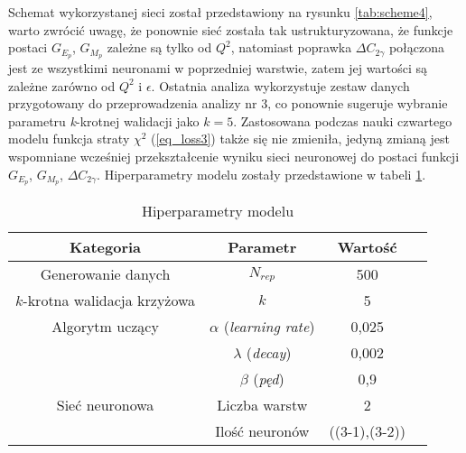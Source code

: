 \documentclass[11pt]{book}
\theoremstyle{definition}
\begin{document}
\begin{SCfigure}[][h]
{}
	\caption{Schemat sieci neuronowej zastosowanej w czwartej analizie, struktura jest bliźniacza do sieci zastosowanej w trzeciej analizie jednak neurony w warstwie wyjściowej modelu zmieniły się na: $o_{E_p}$, $o_{M_p}$ i $o_{2\gamma}$ } \label{tab:scheme4} 	
\end{SCfigure}

%
Schemat wykorzystanej sieci został przedstawiony na rysunku \ref{tab:scheme4}, warto zwrócić uwagę, że ponownie sieć została tak ustrukturyzowana, że funkcje postaci $G_{E_p}$, $G_{M_p}$ zależne są tylko od $Q^2$, natomiast poprawka $\Delta C_{2\gamma}$ połączona jest ze wszystkimi neuronami w poprzedniej warstwie, zatem jej wartości są zależne zarówno od $Q^2$ i $\epsilon$. Ostatnia analiza wykorzystuje zestaw danych przygotowany do przeprowadzenia analizy nr 3, co ponownie sugeruje wybranie parametru \textit{k}-krotnej walidacji jako $k=5$. Zastosowana podczas nauki czwartego modelu funkcja straty $\chi^2$ (\ref{eq_loss3}) także się nie zmieniła, jedyną zmianą jest wspomniane wcześniej przekształcenie wyniku sieci neuronowej do postaci funkcji $G_{E_p}$, $G_{M_p}$, $\Delta C_{2 \gamma}$. Hiperparametry modelu zostały przedstawione w tabeli \ref{tab:hyper4}.
%

\begin{table}[h]
	\centering
	\caption{Hiperparametry modelu}\label{tab:hyper4} 
	\begin{tabular}{c|c c c}
		\hline 
		Kategoria & Parametr & Wartość &   \\\hline
		Generowanie danych & $N_{rep}$ & 500 & \\ \hline
		$k$-krotna walidacja krzyżowa & $k$ & 5 &\\ \hline
		
		Algorytm uczący& $\alpha$ (\textit{learning rate}) & 0,025 & \\
		& $\lambda$ (\textit{decay}) & 0,002 & \\ 
		& $\beta$ (\textit{pęd}) & 0,9 & \\ \hline
		Sieć neuronowa & Liczba warstw & 2 & \\ 
		& Ilość neuronów & ((3-1),(3-2)) & \\ \hline
		
	\end{tabular}
\end{table}
\end{document}
